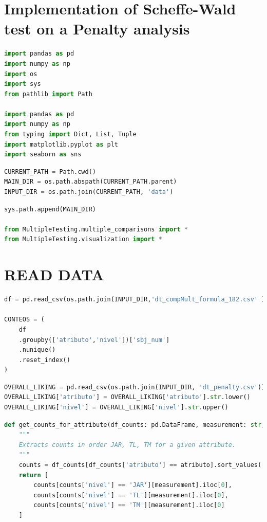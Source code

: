 \hypertarget{implementation-of-scheffe-wald-test-on-a-penalty-analysis}{%
\section{Implementation of Scheffe-Wald test on a Penalty
analysis}\label{implementation-of-scheffe-wald-test-on-a-penalty-analysis}}

\begin{lstlisting}[language=Python]
import pandas as pd
import numpy as np
import os
import sys
from pathlib import Path

import pandas as pd
import numpy as np
from typing import Dict, List, Tuple
import matplotlib.pyplot as plt
import seaborn as sns
\end{lstlisting}

\begin{lstlisting}[language=Python]
CURRENT_PATH = Path.cwd()
MAIN_DIR = os.path.abspath(CURRENT_PATH.parent)
INPUT_DIR = os.path.join(CURRENT_PATH, 'data')
\end{lstlisting}

\begin{lstlisting}[language=Python]
sys.path.append(MAIN_DIR)

from MultipleTesting.multiple_comparisons import *
from MultipleTesting.visualization import *
\end{lstlisting}

\hypertarget{read-data}{%
\section{READ DATA}\label{read-data}}

\begin{lstlisting}[language=Python]
df = pd.read_csv(os.path.join(INPUT_DIR,'dt_compMult_formula_182.csv' ))

CONTEOS = (
    df
    .groupby(['atributo','nivel'])['sbj_num']
    .nunique()
    .reset_index()
)
\end{lstlisting}

\begin{lstlisting}[language=Python]
OVERALL_LIKING = pd.read_csv(os.path.join(INPUT_DIR, 'dt_penalty.csv'))
OVERALL_LIKING['atributo'] = OVERALL_LIKING['atributo'].str.lower()
OVERALL_LIKING['nivel'] = OVERALL_LIKING['nivel'].str.upper()
\end{lstlisting}

\begin{lstlisting}[language=Python]
def get_counts_for_attribute(df_counts: pd.DataFrame, measurement: str, atributo: str) -> list:
    """
    Extracts counts in order JAR, TL, TM for a given attribute.
    """
    counts = df_counts[df_counts['atributo'] == atributo].sort_values('nivel')
    return [
        counts[counts['nivel'] == 'JAR'][measurement].iloc[0],
        counts[counts['nivel'] == 'TL'][measurement].iloc[0],
        counts[counts['nivel'] == 'TM'][measurement].iloc[0]
    ]
\end{lstlisting}

